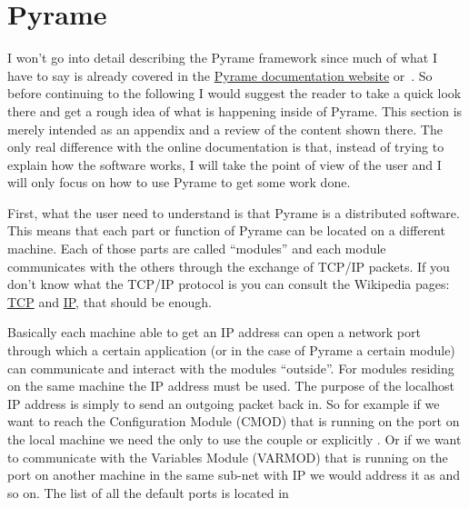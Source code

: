 \section{Pyrame}
I won't go into detail describing the Pyrame framework since much of
what I have to say is already covered in the
\href{http://llr.in2p3.fr/sites/pyrame/documentation/}{Pyrame
  documentation website} or~\cite{Rubio-Roy:2015}. So before
continuing to the following I would suggest the reader to take a quick
look there and get a rough idea of what is happening inside of
Pyrame. This section is merely intended as an appendix and a review of
the content shown there. The only real difference with the online
documentation is that, instead of trying to explain how the software
works, I will take the point of view of the user and I will only focus
on how to use Pyrame to get some work done.

First, what the user need to understand is that Pyrame is a
distributed software. This means that each part or function of Pyrame
can be located on a different machine. Each of those parts are called
``modules'' and each module communicates with the others through the
exchange of TCP/IP packets. If you don't know what the TCP/IP protocol
is you can consult the Wikipedia pages:
\href{https://en.wikipedia.org/wiki/Transmission_Control_Protocol}{TCP}
and \href{https://en.wikipedia.org/wiki/IPv4}{IP}, that should be
enough.

Basically each machine able to get an IP address can open a network
port through which a certain application (or in the case of Pyrame a
certain module) can communicate and interact with the modules
``outside''. For modules residing on the same machine the
 IP address must be used. The purpose
of the localhost IP address is simply to send an outgoing packet back
in. So for example if we want to reach the Configuration Module (CMOD)
that is running on the port  on the local
machine we need the only to use the couple
 or explicitly
. Or if we want to communicate with the
Variables Module (VARMOD) that is running on the port
 on another machine in the same sub-net
with IP  we would address it as
 and so on.  The list of all the
default ports is located in 


